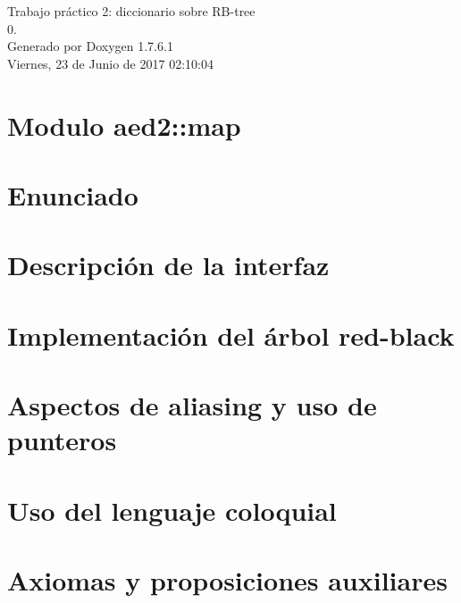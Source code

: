 \documentclass[a4paper]{article}
\begin{document}
\hypersetup{pageanchor=false,citecolor=blue}
\begin{titlepage}
\vspace*{7cm}
\begin{center}
{\Large \-Trabajo práctico 2\-: diccionario sobre \-R\-B-\/tree \\[1ex]\large 0. }\\
\vspace*{1cm}
{\large \-Generado por Doxygen 1.7.6.1}\\
\vspace*{0.5cm}
{\small Viernes, 23 de Junio de 2017 02:10:04}\\
\end{center}
\end{titlepage}
\tableofcontents
{}
\hypersetup{pageanchor=true,citecolor=blue}
\section{\-Modulo aed2\-:\-:map}
\label{index}\hypertarget{index}{}
\section{\-Enunciado}
\label{Enunciado}
\hypertarget{Enunciado}{}

\section{\-Descripción de la interfaz}
\label{Interfaz}
\hypertarget{Interfaz}{}

\section{\-Implementación del árbol red-\/black}
\label{Implementacion}
\hypertarget{Implementacion}{}

\section{\-Aspectos de aliasing y uso de punteros}
\label{Aliasing}
\hypertarget{Aliasing}{}

\section{\-Uso del lenguaje coloquial}
\label{Castellano}
\hypertarget{Castellano}{}

\section{\-Axiomas y proposiciones auxiliares}
\label{axiomas}
\hypertarget{axiomas}{}

\end{document}
